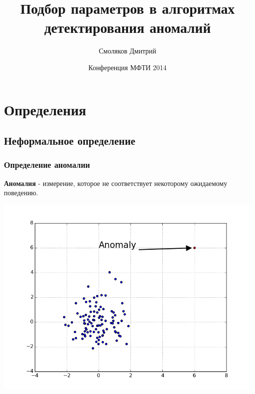\documentclass[10pt,pdf]{beamer}
\title{Подбор параметров в алгоритмах детектирования аномалий}
\author{Смоляков Дмитрий}
\institute{ИППИ РАН}
\date{Конференция МФТИ 2014}
\begin{document}
\maketitle
\section{Определения}
\subsection{Неформальное определение}
\begin{frame}\frametitle{Определение аномалии}
\textbf{Аномалия} - измерение, которое не соответствует некоторому ожидаемому поведению.
\begin{center}
\includegraphics[scale=0.45]{anomaly_example}
\end{center}
\end{frame}
\end{document}
